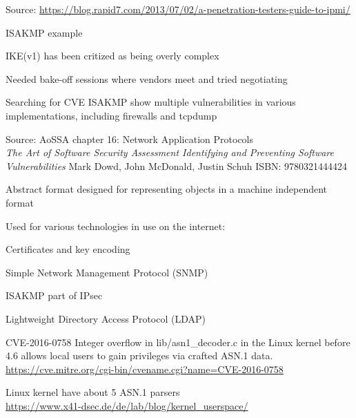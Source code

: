 \documentclass[Screen16to9,17pt]{foils}
\begin{document}
Source: \url{https://blog.rapid7.com/2013/07/02/a-penetration-testers-guide-to-ipmi/}


\begin{list2}
\item ISAKMP example
\item IKE(v1) has been critized as being overly complex
\item Needed bake-off sessions where vendors meet and tried negotiating
\item Searching for CVE ISAKMP show multiple vulnerabilities in various implementations, including firewalls and tcpdump
\item Source: AoSSA chapter 16: Network Application Protocols\\
\emph{The Art of Software Security Assessment Identifying and Preventing
Software Vulnerabilities}
Mark Dowd, John McDonald, Justin Schuh ISBN: 9780321444424
\end{list2}




\begin{list2}
\item Abstract format designed for representing objects in a machine independent format
\item Used for various technologies in use on the internet:
\item Certificates and key encoding
\item Simple Network Management Protocol (SNMP)
\item ISAKMP part of IPsec
\item Lightweight Directory Access Protocol (LDAP)
\end{list2}


\begin{list2}
\item CVE-2016-0758 Integer overflow in lib/asn1\_decoder.c in the Linux kernel before 4.6 allows local users to gain privileges via crafted ASN.1 data.\\
\url{https://cve.mitre.org/cgi-bin/cvename.cgi?name=CVE-2016-0758}
\item Linux kernel have about 5 ASN.1 parsers\\
\url{https://www.x41-dsec.de/de/lab/blog/kernel_userspace/}
\end{list2}
\end{document}
